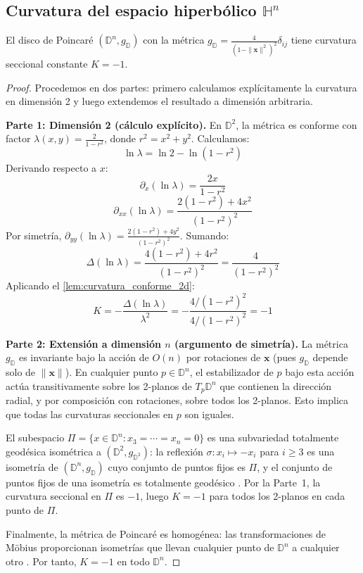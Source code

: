 \subsection{Curvatura del espacio hiperbólico \texorpdfstring{$\mathbb{H}^n$}{Hn}}\label{subsec:curvatura_hiperbolico}

\begin{theorem}\label{thm:curvatura_hiperbolico}
El disco de Poincaré $(\mathbb{D}^n, g_{\mathbb{D}})$ con la métrica $g_{\mathbb{D}} = \frac{4}{(1-\|\mathbf{x}\|^2)^2}\delta_{ij}$ tiene curvatura seccional constante $K = -1$.
\end{theorem}

\begin{proof}
Procedemos en dos partes: primero calculamos explícitamente la curvatura en dimensión 2 y luego extendemos el resultado a dimensión arbitraria.

\textbf{Parte 1: Dimensión 2 (cálculo explícito).}
En $\mathbb{D}^2$, la métrica es conforme con factor $\lambda(x,y) = \frac{2}{1 - r^2}$, donde $r^2 = x^2 + y^2$. Calculamos:
\[
\ln\lambda = \ln 2 - \ln(1 - r^2)
\]
Derivando respecto a $x$:
\[
\partial_x(\ln\lambda) = \frac{2x}{1 - r^2}
\]
\[
\partial_{xx}(\ln\lambda) = \frac{2(1-r^2) + 4x^2}{(1-r^2)^2}
\]
Por simetría, $\partial_{yy}(\ln\lambda) = \frac{2(1-r^2) + 4y^2}{(1-r^2)^2}$. Sumando:
\[
\Delta(\ln\lambda) = \frac{4(1-r^2) + 4r^2}{(1-r^2)^2} = \frac{4}{(1-r^2)^2}
\]
Aplicando el \autoref{lem:curvatura_conforme_2d}:
\[
K = -\frac{\Delta(\ln\lambda)}{\lambda^2} = -\frac{4/(1-r^2)^2}{4/(1-r^2)^2} = -1
\]

\textbf{Parte 2: Extensión a dimensión $n$ (argumento de simetría).}
La métrica $g_{\mathbb{D}}$ es invariante bajo la acción de $O(n)$ por rotaciones de $\mathbf{x}$ (pues $g_{\mathbb{D}}$ depende solo de $\|\mathbf{x}\|$). En cualquier punto $p \in \mathbb{D}^n$, el estabilizador de $p$ bajo esta acción actúa transitivamente sobre los 2-planos de $T_p\mathbb{D}^n$ que contienen la dirección radial, y por composición con rotaciones, sobre todos los 2-planos. Esto implica que todas las curvaturas seccionales en $p$ son iguales.

El subespacio $\Pi = \{x \in \mathbb{D}^n : x_3 = \cdots = x_n = 0\}$ es una subvariedad totalmente geodésica isométrica a $(\mathbb{D}^2, g_{\mathbb{D}^2})$: la reflexión $\sigma: x_i \mapsto -x_i$ para $i \geq 3$ es una isometría de $(\mathbb{D}^n, g_{\mathbb{D}})$ cuyo conjunto de puntos fijos es $\Pi$, y el conjunto de puntos fijos de una isometría es totalmente geodésico \citep[Proposición~5.21]{lee2018introduction}. Por la Parte~1, la curvatura seccional en $\Pi$ es $-1$, luego $K = -1$ para todos los 2-planos en cada punto de $\Pi$.

Finalmente, la métrica de Poincaré es homogénea: las transformaciones de Möbius proporcionan isometrías que llevan cualquier punto de $\mathbb{D}^n$ a cualquier otro \citep{nickel2017poincare}. Por tanto, $K = -1$ en todo $\mathbb{D}^n$.
\end{proof}

